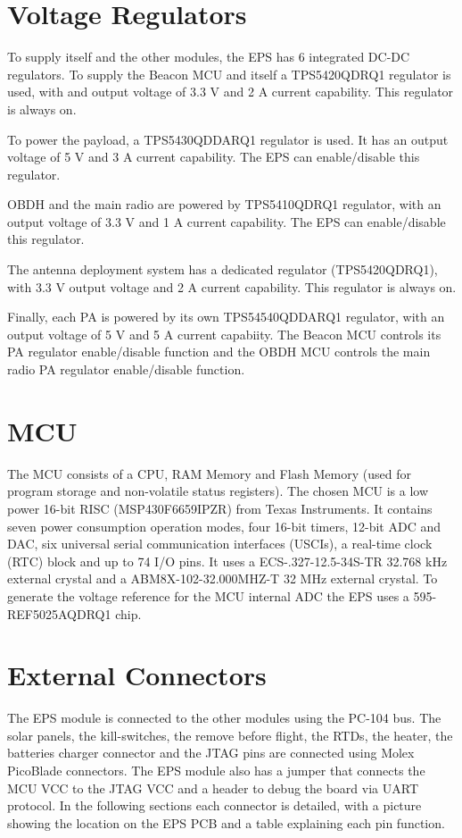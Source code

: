 \section{Voltage Regulators}

To supply itself and the other modules, the EPS has 6 integrated DC-DC regulators. To supply the Beacon MCU and itself a TPS5420QDRQ1 regulator is used, with and output voltage of 3.3 V and 2 A current capability. This regulator is always on.

To power the payload, a TPS5430QDDARQ1 regulator is used. It has an output voltage of 5 V and 3 A current capability. The EPS can enable/disable this regulator.

OBDH and the main radio are powered by TPS5410QDRQ1 regulator, with an output voltage of 3.3 V and 1 A current capability. The EPS can enable/disable this regulator.

The antenna deployment system has a dedicated regulator (TPS5420QDRQ1), with 3.3 V output voltage and 2 A current capability. This regulator is always on.

Finally, each PA is powered by its own TPS54540QDDARQ1 regulator, with an output voltage of 5 V and 5 A current capabiity. The Beacon MCU controls its PA regulator enable/disable function and the OBDH MCU controls the main radio PA regulator enable/disable function.

\section{MCU}

The MCU consists of a CPU, RAM Memory and Flash Memory (used for program storage and non-volatile status registers). The chosen MCU is a low power 16-bit RISC (MSP430F6659IPZR) from Texas Instruments. It contains seven power consumption operation modes, four 16-bit timers, 12-bit ADC and DAC, six universal serial communication interfaces (USCIs), a real-time clock (RTC) block and up to 74 I/O pins. It uses a ECS-.327-12.5-34S-TR 32.768 kHz external crystal and a ABM8X-102-32.000MHZ-T 32 MHz external crystal. To generate the voltage reference for the MCU internal ADC the EPS uses a 595-REF5025AQDRQ1 chip.

\section{External Connectors}

The EPS module is connected to the other modules using the PC-104 bus. The solar panels, the kill-switches, the remove before flight, the RTDs, the heater, the batteries charger connector and the JTAG pins are connected using Molex PicoBlade connectors. The EPS module also has a jumper that connects the MCU VCC to the JTAG VCC and a header to debug the board via UART protocol. In the following sections each connector is detailed, with a picture showing the location on the EPS PCB and a table explaining each pin function.

